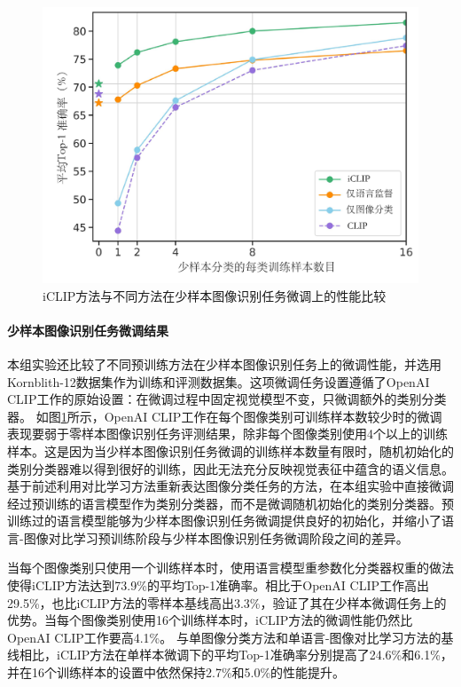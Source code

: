 \begin{figure}
  \centering
  \includegraphics[width=0.8\linewidth]{figures/iclip-fewshot.pdf}
  \caption{iCLIP方法与不同方法在少样本图像识别任务微调上的性能比较}
  \label{fig:iclip-fewshot}
\end{figure}

\paragraph{少样本图像识别任务微调结果} 本组实验还比较了不同预训练方法在少样本图像识别任务上的微调性能，并选用Kornblith-12数据集作为训练和评测数据集。这项微调任务设置遵循了OpenAI CLIP工作的原始设置：在微调过程中固定视觉模型不变，只微调额外的类别分类器。
如图\ref{fig:iclip-fewshot}所示，OpenAI CLIP工作在每个图像类别可训练样本数较少时的微调表现要弱于零样本图像识别任务评测结果，除非每个图像类别使用4个以上的训练样本。这是因为当少样本图像识别任务微调的训练样本数量有限时，随机初始化的类别分类器难以得到很好的训练，因此无法充分反映视觉表征中蕴含的语义信息。
基于前述利用对比学习方法重新表达图像分类任务的方法，在本组实验中直接微调经过预训练的语言模型作为类别分类器，而不是微调随机初始化的类别分类器。预训练过的语言模型能够为少样本图像识别任务微调提供良好的初始化，并缩小了语言-图像对比学习预训练阶段与少样本图像识别任务微调阶段之间的差异。

当每个图像类别只使用一个训练样本时，使用语言模型重参数化分类器权重的做法使得iCLIP方法达到73.9\%的平均Top-1准确率。相比于OpenAI CLIP工作高出29.5\%，也比iCLIP方法的零样本基线高出3.3\%，验证了其在少样本微调任务上的优势。当每个图像类别使用16个训练样本时，iCLIP方法的微调性能仍然比OpenAI CLIP工作要高4.1\%。
与单图像分类方法和单语言-图像对比学习方法的基线相比，iCLIP方法在单样本微调下的平均Top-1准确率分别提高了24.6\%和6.1\%，并在16个训练样本的设置中依然保持2.7\%和5.0\%的性能提升。

